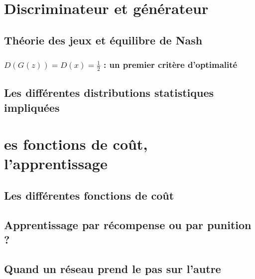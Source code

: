 \section{Discriminateur et générateur}
\subsection{Théorie des jeux et équilibre de Nash}
\subsubsection{$D(G(z)) = D(x) = \frac{1}{2}$ : un premier critère d'optimalité}
\subsection{Les différentes distributions statistiques impliquées}
\section{es fonctions de coût, l'apprentissage}
\subsection{Les différentes fonctions de coût}
\subsection{Apprentissage par récompense ou par punition ?}
\subsection{Quand un réseau prend le pas sur l'autre}
